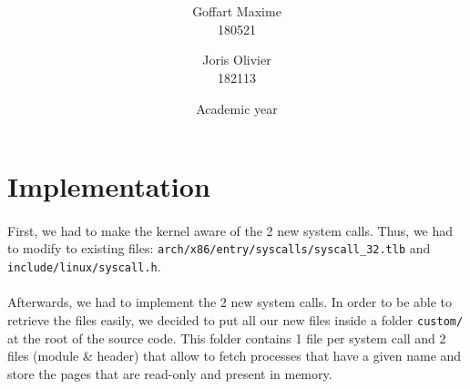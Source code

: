 \documentclass[a4paper, 11pt, oneside]{article}
\title{\ClassName\\\vspace*{0.8cm}\ProjectName\vspace{0.8cm}}
\author{Goffart Maxime \\180521 \and Joris Olivier \\ 182113}
\date{\vspace{1cm}Academic year \AcademicYear}
\begin{document}
\begin{titlingpage}
{\let\newpage\relax\maketitle}
\end{titlingpage}


\section{Implementation}
\paragraph{}First, we had to make the kernel aware of the 2 new system calls. Thus, we had to modify to existing files: \texttt{arch/x86/entry/syscalls/syscall\_32.tlb} and \texttt{include/linux/syscall.h}.

\paragraph{}Afterwards, we had to implement the 2 new system calls. In order to be able to retrieve the files easily, we decided to put all our new files inside a folder \texttt{custom/} at the root of the source code. This folder contains 1 file per system call and 2 files (module \& header) that allow to fetch processes that have a given name and store the pages that are read-only and present in memory.
\end{document}

